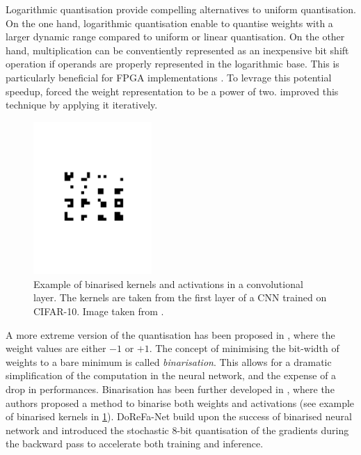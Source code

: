 Logarithmic quantisation provide compelling alternatives to uniform
quantisation. On the one hand, logarithmic quantisation enable to quantise
weights with a larger dynamic range compared to uniform or linear quantisation.
On the other hand, multiplication can be conventiently represented as an
inexpensive bit shift operation if operands are properly represented in the
logarithmic base. This is particularly beneficial for \ac{FPGA} implementations
\cite{alemdar2017ternary}. To levrage this potential speedup,
\cite{DBLP:journals/corr/LinCMB15} forced the weight representation to be a
power of two. \cite{DBLP:conf/iclr/ZhouYGXC17} improved this technique by
applying it iteratively.\\


\begin{figure}[htbp]
    \centering
    \includegraphics[width=0.40\textwidth,trim=5cm 9cm 5cm 9cm, clip]{chapter_sota/assets/binarised_kernels.pdf}
    \caption{Example of binarised kernels and activations in a convolutional
    layer. The kernels are taken from the first layer of a \ac{CNN} trained on CIFAR-10.
    Image taken from \cite{DBLP:conf/nips/HubaraCSEB16}.}
    \label{fig:sota:binarised_kernels}
\end{figure}

A more extreme version of the quantisation has been proposed in
\cite{courbariaux2015binaryconnect}, where the weight values are either $-1$ or
$+1$. The concept of minimising the bit-width of weights to a bare minimum is
called \emph{binarisation}. This allows for a dramatic simplification of the
computation in the neural network, and the expense of a drop in performances.
Binarisation has been further developed in \cite{DBLP:conf/nips/HubaraCSEB16},
where the authors proposed a method to binarise both weights and activations
(see example of binarised kernels in \cref{fig:sota:binarised_kernels}).
DoReFa-Net \cite{zhou2016dorefa} build upon the success of binarised neural
network and introduced the stochastic 8-bit quantisation of the gradients during
the backward pass to accelerate both training and inference.\\


